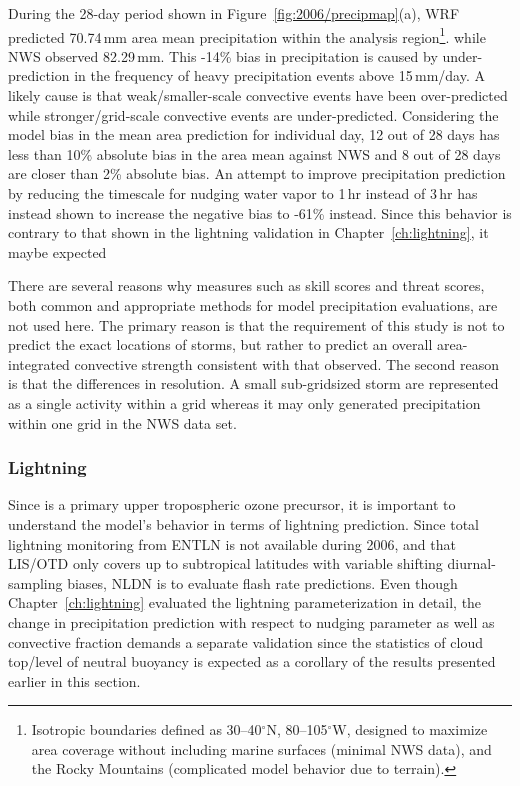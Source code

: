 During the 28-day period shown in Figure~\ref{fig:2006/precipmap}(a), WRF predicted 70.74\,\unit{mm} area mean
precipitation within the analysis region\footnote{Isotropic boundaries defined as 30--40$^\circ$N, 80--105$^\circ$W, designed
to maximize area coverage without including marine surfaces (minimal NWS data), and the Rocky Mountains (complicated
model behavior due to terrain).}. while NWS observed 82.29\,\unit{mm}. This -14\% bias in precipitation
is caused by under-prediction in the frequency of heavy precipitation events above 15\,\unit{mm/day}. A likely
cause is that weak/smaller-scale convective events have been over-predicted while stronger/grid-scale convective
events are under-predicted.  Considering the model bias in the mean area prediction for individual day, 12 out of
28 days has less than 10\% absolute bias in the area mean against NWS and 8 out of 28 days are closer than
2\% absolute bias. An attempt to improve precipitation prediction by reducing the timescale for nudging
water vapor to 1\,\unit{hr} instead of 3\,\unit{hr} has instead shown to increase the negative bias to -61\% instead.
Since this behavior is contrary to that shown in the lightning validation in Chapter~\ref{ch:lightning}, it maybe expected

There are several reasons why measures such as skill scores and threat scores, both common and appropriate methods for
model precipitation evaluations, are not used here. The primary reason is that the requirement of this study is not to predict
the exact locations of storms, but rather to predict an overall area-integrated convective strength consistent with that
observed. The second reason is that the differences in resolution. A small sub-gridsized storm are represented as
a single activity within a {} grid whereas it may only generated precipitation within one {} grid
in the NWS data set.

\subsubsection{Lightning}

Since {\lnox} is a primary upper tropospheric ozone precursor, it is important to understand the model's behavior in
terms of lightning prediction. Since total lightning monitoring from ENTLN is not available during 2006, and that LIS/OTD
only covers up to subtropical latitudes with variable shifting diurnal-sampling biases, NLDN is to evaluate flash rate predictions.
Even though Chapter~\ref{ch:lightning} evaluated the lightning parameterization in detail, the change in precipitation
prediction with respect to nudging parameter as well as convective fraction demands a separate validation since
the statistics of cloud top/level of neutral buoyancy is expected as a corollary of the results presented earlier in this section.

